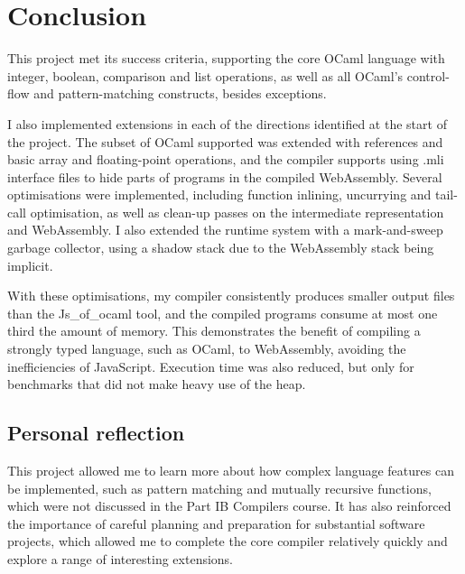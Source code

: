 \chapter{Conclusion}

This project met its success criteria, supporting the core OCaml language with integer, boolean, comparison and list operations, as well as all OCaml's control-flow and pattern-matching constructs, besides exceptions.

I also implemented extensions in each of the directions identified at the start of the project. The subset of OCaml supported was extended with references and basic array and floating-point operations, and the compiler supports using .mli interface files to hide parts of programs in the compiled WebAssembly.
Several optimisations were implemented, including function inlining, uncurrying and tail-call optimisation, as well as clean-up passes on the intermediate representation and WebAssembly.
I also extended the runtime system with a mark-and-sweep garbage collector, using a shadow stack due to the WebAssembly stack being implicit.%

With these optimisations, my compiler consistently produces smaller output files than the Js\_of\_ocaml tool, and the compiled programs consume at most one third the amount of memory. 
This demonstrates the benefit of compiling a strongly typed language, such as OCaml, to WebAssembly, avoiding the inefficiencies of JavaScript. Execution time was also reduced, but only for benchmarks that did not make heavy use of the heap.


\section{Personal reflection}
This project allowed me to learn more about how complex language features can be implemented, such as pattern matching and mutually recursive functions, which were not discussed in the Part IB Compilers course. It has also reinforced the importance of careful planning and preparation for substantial software projects, which allowed me to complete the core compiler relatively quickly and explore a range of interesting extensions. 

